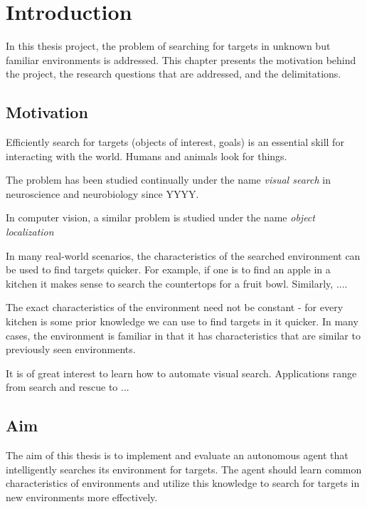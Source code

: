 \chapter{Introduction}
\label{cha:introduction}


In this thesis project, the problem of searching for targets in unknown but familiar environments is addressed. This chapter presents the motivation behind the project, the research questions that are addressed, and the delimitations. 

\section{Motivation}
\label{sec:motivation}

Efficiently search for targets (objects of interest, goals) is an essential skill for interacting with the world. Humans and animals look for things.

The problem has been studied continually under the name \textit{visual search} in neuroscience and neurobiology since YYYY. 

In computer vision, a similar problem is studied under the name \textit{object localization}

In many real-world scenarios, the characteristics of the searched environment can be used to find targets quicker. For example, if one is to find an apple in a kitchen it makes sense to search the countertops for a fruit bowl. Similarly, ....

The exact characteristics of the environment need not be constant - for every kitchen is some prior knowledge we can use to find targets in it quicker. In many cases, the environment is familiar in that it has characteristics that are similar to previously seen environments.

It is of great interest to learn how to automate visual search. Applications range from search and rescue to ...


\section{Aim}
\label{sec:aim}

The aim of this thesis is to implement and evaluate an autonomous agent that intelligently searches its environment for targets. The agent should learn common characteristics of environments and utilize this knowledge to search for targets in new environments more effectively.

